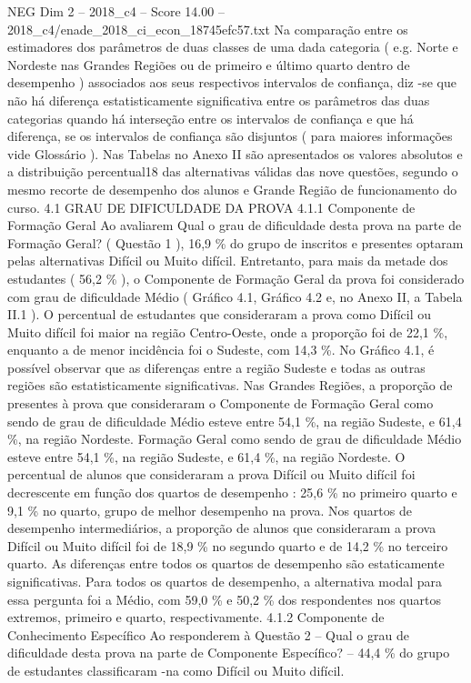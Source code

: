 \begin{textsample}{NEG Dim 2 – 2018\_c4 – Score 14.00 – 2018\_c4/enade\_2018\_ci\_econ\_18745efc57.txt}
Na comparação entre os estimadores dos parâmetros de duas classes de uma dada categoria ( e.g.
Norte e Nordeste nas Grandes Regiões ou de primeiro e último quarto dentro de desempenho ) associados aos seus respectivos intervalos de confiança, diz -se que não há diferença estatisticamente significativa entre os parâmetros das duas categorias quando há interseção entre os intervalos de confiança e que há diferença, se os intervalos de confiança são disjuntos ( para maiores informações vide Glossário ).
Nas Tabelas no Anexo II são apresentados os valores absolutos e a distribuição percentual18 das alternativas válidas das nove questões, segundo o mesmo recorte de desempenho dos alunos e Grande Região de funcionamento do curso. 4.1 GRAU DE DIFICULDADE DA PROVA 4.1.1 Componente de Formação Geral Ao avaliarem Qual o grau de dificuldade desta prova na parte de Formação Geral? ( Questão 1 ), 16,9 \% do grupo de inscritos e presentes optaram pelas alternativas Difícil ou Muito difícil.
Entretanto, para mais da metade dos estudantes ( 56,2 \% ), o Componente de Formação Geral da prova foi considerado com grau de dificuldade Médio ( Gráfico 4.1, Gráfico 4.2 e, no Anexo II, a Tabela II.1 ).
O percentual de estudantes que consideraram a prova como Difícil ou Muito difícil foi maior na região Centro-Oeste, onde a proporção foi de 22,1 \%, enquanto a de menor incidência foi o Sudeste, com 14,3 \%.
No Gráfico 4.1, é possível observar que as diferenças entre a região Sudeste e todas as outras regiões são estatisticamente significativas.
Nas Grandes Regiões, a proporção de presentes à prova que consideraram o Componente de Formação Geral como sendo de grau de dificuldade Médio esteve entre 54,1 \%, na região Sudeste, e 61,4 \%, na região Nordeste.
Formação Geral como sendo de grau de dificuldade Médio esteve entre 54,1 \%, na região Sudeste, e 61,4 \%, na região Nordeste.
O percentual de alunos que consideraram a prova Difícil ou Muito difícil foi decrescente em função dos quartos de desempenho : 25,6 \% no primeiro quarto e 9,1 \% no quarto, grupo de melhor desempenho na prova.
Nos quartos de desempenho intermediários, a proporção de alunos que consideraram a prova Difícil ou Muito difícil foi de 18,9 \% no segundo quarto e de 14,2 \% no terceiro quarto.
As diferenças entre todos os quartos de desempenho são estaticamente significativas.
Para todos os quartos de desempenho, a alternativa modal para essa pergunta foi a Médio, com 59,0 \% e 50,2 \% dos respondentes nos quartos extremos, primeiro e quarto, respectivamente. 4.1.2 Componente de Conhecimento Específico Ao responderem à Questão 2 – Qual o grau de dificuldade desta prova na parte de Componente Específico? – 44,4 \% do grupo de estudantes classificaram -na como Difícil ou Muito difícil.

\end{textsample}
